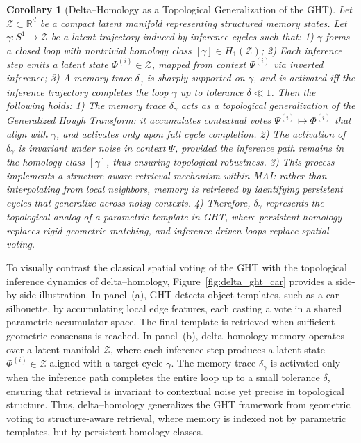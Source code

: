 \documentclass[lettersize,journal]{IEEEtran}
\newtheorem{corollary}{Corollary}
\begin{document}
\begin{corollary}[Delta–Homology as a Topological Generalization of the GHT]
Let \( \mathcal{Z} \subset \mathbb{R}^d \) be a compact latent manifold representing structured memory states. Let \( \gamma: S^1 \to \mathcal{Z} \) be a latent trajectory induced by inference cycles such that:
1) \( \gamma \) forms a closed loop with nontrivial homology class \( [\gamma] \in H_1(\mathcal{Z}) \);
2) Each inference step emits a latent state \( \Phi^{(i)} \in \mathcal{Z} \), mapped from context \( \Psi^{(i)} \) via inverted inference;
3) A memory trace \( \delta_\gamma \) is sharply supported on \( \gamma \), and is activated iff the inference trajectory completes the loop \( \gamma \) up to tolerance \( \delta \ll 1 \).
Then the following holds:
1) The memory trace \( \delta_\gamma \) acts as a topological generalization of the Generalized Hough Transform: it accumulates contextual votes \( \Psi^{(i)} \mapsto \Phi^{(i)} \) that align with \( \gamma \), and activates only upon full cycle completion.
2) The activation of \( \delta_\gamma \) is invariant under noise in context \( \Psi \), provided the inference path remains in the homology class \( [\gamma] \), thus ensuring topological robustness.
3) This process implements a \emph{structure-aware retrieval mechanism} within MAI: rather than interpolating from local neighbors, memory is retrieved by identifying persistent cycles that generalize across noisy contexts.
4) Therefore, \( \delta_\gamma \) represents the topological analog of a parametric template in GHT, where persistent homology replaces rigid geometric matching, and inference-driven loops replace spatial voting.
\label{cor:delta_ght}
\end{corollary}

To visually contrast the classical spatial voting of the GHT with the topological inference dynamics of delta–homology, Figure~\ref{fig:delta_ght_car} provides a side-by-side illustration. In panel~(a), GHT detects object templates, such as a car silhouette, by accumulating local edge features, each casting a vote in a shared parametric accumulator space. The final template is retrieved when sufficient geometric consensus is reached. In panel~(b), delta–homology memory operates over a latent manifold \( \mathcal{Z} \), where each inference step produces a latent state \( \Phi^{(i)} \in \mathcal{Z} \) aligned with a target cycle \( \gamma \). The memory trace \( \delta_\gamma \) is activated only when the inference path completes the entire loop up to a small tolerance \( \delta \), ensuring that retrieval is invariant to contextual noise yet precise in topological structure. Thus, delta–homology generalizes the GHT framework from geometric voting to structure-aware retrieval, where memory is indexed not by parametric templates, but by persistent homology classes.
\end{document}
